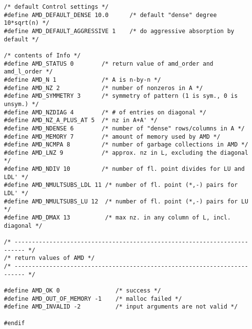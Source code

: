 \documentclass[11pt]{article}
\begin{document}
{\begin{verbatim}
/* default Control settings */
#define AMD_DEFAULT_DENSE 10.0      /* default "dense" degree 10*sqrt(n) */
#define AMD_DEFAULT_AGGRESSIVE 1    /* do aggressive absorption by default */

/* contents of Info */
#define AMD_STATUS 0        /* return value of amd_order and amd_l_order */
#define AMD_N 1             /* A is n-by-n */
#define AMD_NZ 2            /* number of nonzeros in A */ 
#define AMD_SYMMETRY 3      /* symmetry of pattern (1 is sym., 0 is unsym.) */
#define AMD_NZDIAG 4        /* # of entries on diagonal */
#define AMD_NZ_A_PLUS_AT 5  /* nz in A+A' */
#define AMD_NDENSE 6        /* number of "dense" rows/columns in A */
#define AMD_MEMORY 7        /* amount of memory used by AMD */
#define AMD_NCMPA 8         /* number of garbage collections in AMD */
#define AMD_LNZ 9           /* approx. nz in L, excluding the diagonal */
#define AMD_NDIV 10         /* number of fl. point divides for LU and LDL' */
#define AMD_NMULTSUBS_LDL 11 /* number of fl. point (*,-) pairs for LDL' */
#define AMD_NMULTSUBS_LU 12  /* number of fl. point (*,-) pairs for LU */
#define AMD_DMAX 13          /* max nz. in any column of L, incl. diagonal */

/* ------------------------------------------------------------------------- */
/* return values of AMD */
/* ------------------------------------------------------------------------- */

#define AMD_OK 0                /* success */
#define AMD_OUT_OF_MEMORY -1    /* malloc failed */
#define AMD_INVALID -2          /* input arguments are not valid */

#endif
\end{verbatim}
}

\newpage



\end{document}
